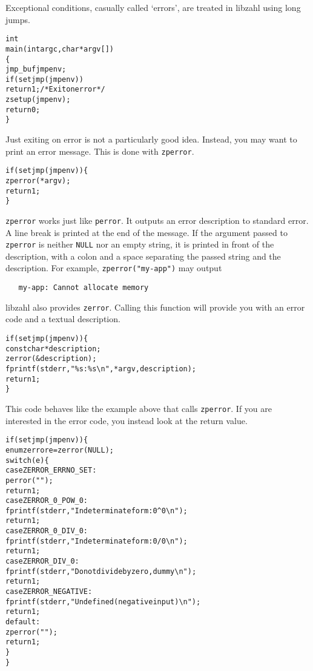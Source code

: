 Exceptional conditions, casually called `errors',
are treated in libzahl using long jumps.

\begin{alltt}
   int
   main(int argc, char *argv[])
   \{
       jmp_buf jmpenv;
       if (setjmp(jmpenv))
           return 1; \textcolor{c}{/* \textrm{Exit on error} */}
       zsetup(jmpenv);
       return 0;
   \}
\end{alltt}

Just exiting on error is not a particularly good
idea. Instead, you may want to print an error message.
This is done with {\tt zperror}.

\begin{alltt}
   if (setjmp(jmpenv)) \{
       zperror(\textcolor{c}{*argv});
       \textcolor{c}{return 1;}
   \}
\end{alltt}

\noindent
{\tt zperror} works just like {\tt perror}. It
outputs an error description to standard error.
A line break is printed at the end of the message.
If the argument passed to {\tt zperror} is neither
{\tt NULL} nor an empty string, it is printed in
front of the description, with a colon and a
space separating the passed string and the description.
For example, {\tt zperror("my-app")} may output

\begin{verbatim}
   my-app: Cannot allocate memory
\end{verbatim}

libzahl also provides {\tt zerror}. Calling this
function will provide you with an error code and
a textual description.

\begin{alltt}
   \textcolor{c}{if (setjmp(jmpenv)) \{}
       const char *description;
       zerror(&description);
       fprintf(stderr, "\%s: \%s\verb|\|n", *argv, description);
       \textcolor{c}{return 1;}
   \textcolor{c}{\}}
\end{alltt}

\noindent
This code behaves like the example above that
calls {\tt zperror}. If you are interested in the
error code, you instead look at the return value.

\begin{alltt}
   \textcolor{c}{if (setjmp(jmpenv)) \{}
       enum zerror e = zerror(NULL);
       switch (e) \{
       case ZERROR_ERRNO_SET:
           perror("");
           \textcolor{c}{return 1;}
       case ZERROR_0_POW_0:
           fprintf(stderr, "Indeterminate form: 0^0\verb|\|n");
           \textcolor{c}{return 1;}
       case ZERROR_0_DIV_0:
           fprintf(stderr, "Indeterminate form: 0/0\verb|\|n");
           \textcolor{c}{return 1;}
       case ZERROR_DIV_0:
           fprintf(stderr, "Do not divide by zero, dummy\verb|\|n");
           \textcolor{c}{return 1;}
       case ZERROR_NEGATIVE:
           fprintf(stderr, "Undefined (negative input)\verb|\|n");
           \textcolor{c}{return 1;}
       default:
           zperror("");
           \textcolor{c}{return 1;}
       \}
   \textcolor{c}{\}}
\end{alltt}

